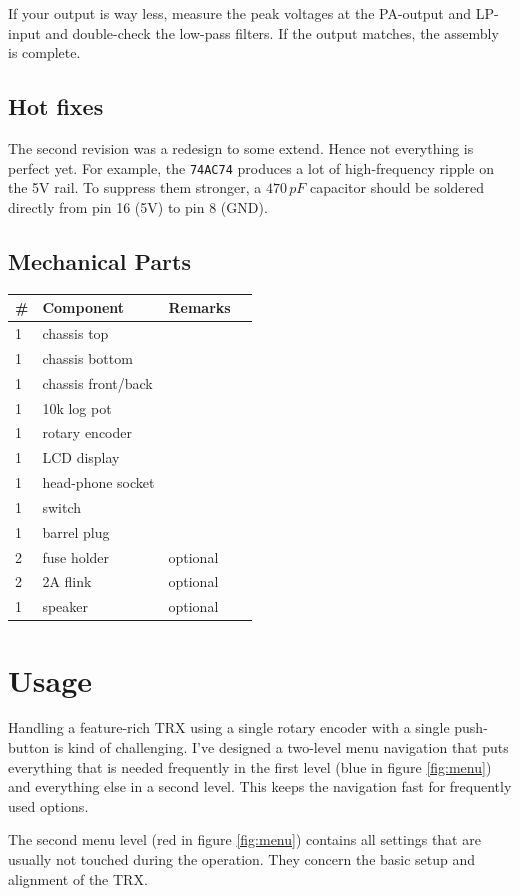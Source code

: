 \documentclass[10pt, a4paper,twoside]{scrartcl}
\begin{document}
If your output is way less, measure the peak voltages at the PA-output and LP-input and double-check the low-pass filters. If the output matches, the assembly is complete. 

\subsection{Hot fixes}
The second revision was a redesign to some extend. Hence not everything is perfect yet. For example, the \texttt{74AC74} produces a lot of high-frequency ripple on the 5V rail. To suppress them stronger, a $470\,pF$ capacitor should be soldered directly from pin 16 (5V) to pin 8 (GND).  

\clearpage
\subsection{Mechanical Parts}
\begin{longtable}{|l|p{6cm}|l|l|} \hline 
\# & Component & Remarks \\ \hline 
1 & chassis top & \\
1 & chassis bottom & \\
1 & chassis front/back & \\
1 & 10k log pot & \\
1 & rotary encoder & \\
1 & LCD display & \\
1 & head-phone socket & \\
1 & switch & \\
1 & barrel plug & \\
2 & fuse holder & optional \\
2 & 2A flink & optional \\
1 & speaker & optional \\ \hline
\end{longtable}


\cleardoublepage
\section{Usage} \label{sec:user}
Handling a feature-rich TRX using a single rotary encoder with a single push-button is kind of challenging. I've designed a two-level menu navigation that puts everything that is needed frequently in the first level (blue in figure \ref{fig:menu}) and everything else in a second level. This keeps the navigation fast for frequently used options. 

The second menu level (red in figure \ref{fig:menu}) contains all settings that are usually not touched during the operation. They concern the basic setup and alignment of the TRX. 
\end{document}
